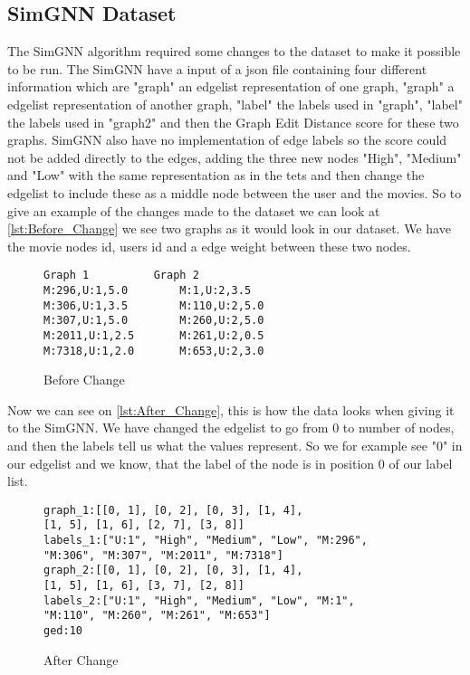 \subsection{SimGNN Dataset}
The SimGNN algorithm required some changes to the dataset to make it possible to be run. The SimGNN have a input of a json file containing four different information which are "graph" an edgelist representation of one graph, "graph" a edgelist representation of another graph, "label" the labels used in "graph", "label" the labels used in "graph2" and then the Graph Edit Distance score for these two graphs. SimGNN also have no implementation of edge labels so the score could not be added directly to the edges, adding the three new nodes "High", "Medium" and "Low" with the same representation as in the tets and then change the edgelist to include these as a middle node between the user and the movies. 
So to give an example of the changes made to the dataset we can look at \autoref{lst:Before_Change} we see two graphs as it would look in our dataset. We have the movie nodes id, users id and a edge weight between these two nodes. 
\begin{figure}
\begin{lstlisting}
Graph 1			 Graph 2
M:296,U:1,5.0		 M:1,U:2,3.5
M:306,U:1,3.5		 M:110,U:2,5.0
M:307,U:1,5.0		 M:260,U:2,5.0
M:2011,U:1,2.5 		 M:261,U:2,0.5
M:7318,U:1,2.0		 M:653,U:2,3.0
\end{lstlisting}
\caption{Before Change}
\label{lst:Before_Change}
\end{figure}
Now we can see on \autoref{lst:After_Change}, this is how the data looks when giving it to the SimGNN. We have changed the edgelist to go from 0 to number of nodes, and then the labels tell us what the values represent. So we for example see "0" in our edgelist and we know, that the label of the node is in position 0 of our label list.
\begin{figure}
\begin{lstlisting}
graph_1:[[0, 1], [0, 2], [0, 3], [1, 4], 
[1, 5], [1, 6], [2, 7], [3, 8]]
labels_1:["U:1", "High", "Medium", "Low", "M:296", 
"M:306", "M:307", "M:2011", "M:7318"]
graph_2:[[0, 1], [0, 2], [0, 3], [1, 4], 
[1, 5], [1, 6], [3, 7], [2, 8]]
labels_2:["U:1", "High", "Medium", "Low", "M:1",
"M:110", "M:260", "M:261", "M:653"]
ged:10
\end{lstlisting}
\caption{After Change}
\label{lst:After_Change}
\end{figure}